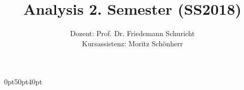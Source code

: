 \titleformat{\part}[display]
{\normalfont\huge\bfseries}{\centering\partname\ \thepart}{20pt}{\Huge\centering}
\titlespacing*{\part}{0pt}{50pt}{40pt}
\titleformat{\chapter}[display]
{\normalfont\huge\bfseries}{\chaptertitlename\ \thechapter}{20pt}{\LARGE}
\titlespacing*{\chapter} {0pt}{50pt}{40pt}
\setlength\parindent{0pt} %
\renewcommand*{\arraystretch}{1.4}


\title{\textbf{Analysis 2. Semester (SS2018)}}
\author{Dozent: Prof. Dr. Friedemann Schuricht\\
	Kursassistenz: Moritz Schönherr}




\frontmatter
\maketitle
\tableofcontents

\mainmetter




\backmatter


